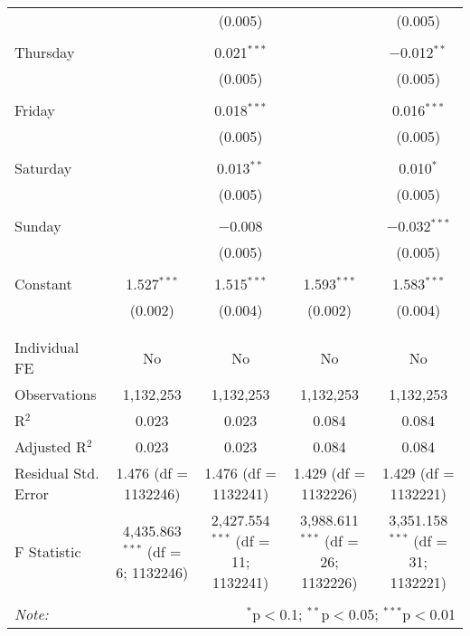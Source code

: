 \documentclass[
]{article}
\begin{document}
\begin{table}[!htbp]
{\begin{tabular}{@{\extracolsep{5pt}}lcccc}
  &  & (0.005) &  & (0.005) \\ 
  & & & & \\ 
 Thursday &  & 0.021$^{***}$ &  & $-$0.012$^{**}$ \\ 
  &  & (0.005) &  & (0.005) \\ 
  & & & & \\ 
 Friday &  & 0.018$^{***}$ &  & 0.016$^{***}$ \\ 
  &  & (0.005) &  & (0.005) \\ 
  & & & & \\ 
 Saturday &  & 0.013$^{**}$ &  & 0.010$^{*}$ \\ 
  &  & (0.005) &  & (0.005) \\ 
  & & & & \\ 
 Sunday &  & $-$0.008 &  & $-$0.032$^{***}$ \\ 
  &  & (0.005) &  & (0.005) \\ 
  & & & & \\ 
 Constant & 1.527$^{***}$ & 1.515$^{***}$ & 1.593$^{***}$ & 1.583$^{***}$ \\ 
  & (0.002) & (0.004) & (0.002) & (0.004) \\ 
  & & & & \\ 
\hline \\[-1.8ex] 
Individual FE & No & No & No & No \\ 
Observations & 1,132,253 & 1,132,253 & 1,132,253 & 1,132,253 \\ 
R$^{2}$ & 0.023 & 0.023 & 0.084 & 0.084 \\ 
Adjusted R$^{2}$ & 0.023 & 0.023 & 0.084 & 0.084 \\ 
Residual Std. Error & 1.476 (df = 1132246) & 1.476 (df = 1132241) & 1.429 (df = 1132226) & 1.429 (df = 1132221) \\ 
F Statistic & 4,435.863$^{***}$ (df = 6; 1132246) & 2,427.554$^{***}$ (df = 11; 1132241) & 3,988.611$^{***}$ (df = 26; 1132226) & 3,351.158$^{***}$ (df = 31; 1132221) \\ 
\hline 
\hline \\[-1.8ex] 
\textit{Note:}  & \multicolumn{4}{r}{$^{*}$p$<$0.1; $^{**}$p$<$0.05; $^{***}$p$<$0.01} \\ 
\end{tabular}
} 
\end{table} 
\newpage
\end{document}
